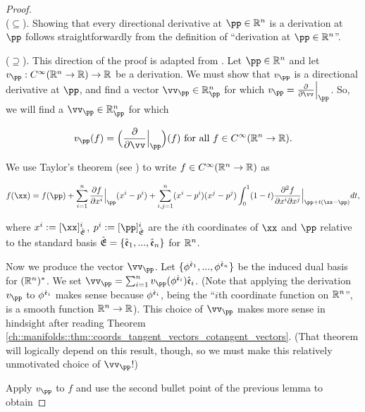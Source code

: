 \begin{proof}
   \mbox{}
   \\ \indent ($\subseteq$). Showing that every directional derivative at $\pp \in \R^n$ is a derivation at $\pp$ follows straightforwardly from the definition of ``derivation at $\pp \in \R^n$''.
    
    ($\supseteq$). This direction of the proof is adapted from \cite[p. 53]{book::SM}. Let $\pp \in \R^n$ and let $v_\pp:C^\infty(\R^n \rightarrow \R) \rightarrow \R$ be a derivation. We must show that $v_\pp$ is a directional derivative at $\pp$, and find a vector $\vv_\pp \in \R^n_\pp$ for which $v_\pp = \frac{\pd}{\pd \vv}\Big|_\pp$. So, we will find a $\vv_\pp \in \R^n_\pp$ for which 
    
    \begin{align*}
        v_\pp(f) = \Big(\frac{\pd}{\pd \vv}\Big|_\pp\Big)(f) \text{ for all $f \in C^\infty(\R^n \rightarrow \R)$.}
    \end{align*}
    
    We use Taylor's theorem (see \cite[p. 53]{book::SM}) to write $f \in C^\infty(\mathbb{R}^n \rightarrow \mathbb{R})$ as
    
    \begin{align*}
        f(\xx) = f(\pp) 
        + \sum_{i = 1}^n \frac{\pd f}{\pd x^i}\Big|_\pp (x^i - p^i)
        + \sum_{i, j = 1}^n (x^i - p^i) (x^j - p^j) \int_0^1 (1 - t) \frac{\pd^2 f}{\pd x^i \pd x^j}\Big|_{\pp + t(\xx - \pp)} dt,
    \end{align*}
    
    where $x^i := [\xx]_\sE^i$, $p^i := [\pp]_\sE^i$ are the $i$th coordinates of $\xx$ and $\pp$ relative to the standard basis ${\hat{\mathfrak{E}}} = \{\hat{\mathfrak{e}}_1, ..., \hat{\mathfrak{e}}_n\}$ for $\mathbb{R}^n$.
    
    Now we produce the vector $\vv_\pp$. Let $\{\phi^{\hat{\mathfrak{e}}_1}, ..., \phi^{\hat{\mathfrak{e}}_n}\}$ be the induced dual basis for $(\mathbb{R}^n)^*$. We set $\vv_\pp = \sum_{i = 1}^n v_\pp(\phi^{\see_i}) \see_i$. (Note that applying the derivation $v_\pp$ to $\phi^{\hat{\mathfrak{e}}_i}$ makes sense because $\phi^{\hat{\mathfrak{e}}_i}$, being the ``$i$th coordinate function on $\mathbb{R}^n$'', is a smooth function $\mathbb{R}^n \rightarrow \mathbb{R}$). This choice of $\vv_\pp$ makes more sense in hindsight after reading Theorem \ref{ch::manifolds::thm::coords_tangent_vectors_cotangent_vectors}. (That theorem will logically depend on this result, though, so we must make this relatively unmotivated choice of $\vv_\pp$!)
    
    Apply $v_\pp$ to $f$ and use the second bullet point of the previous lemma to obtain
    

\end{proof}
